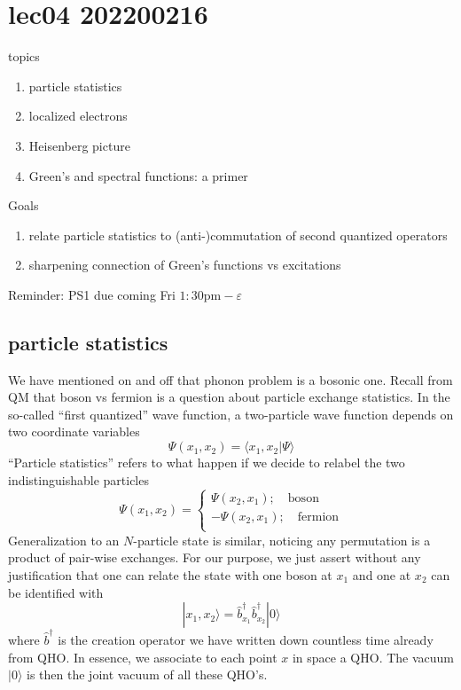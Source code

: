 \chapter{lec04 202200216}

topics

\begin{enumerate}
    \item particle statistics
    \item localized electrons
    \item Heisenberg picture
    \item Green's and spectral functions: a primer
\end{enumerate}

Goals

\begin{enumerate}
    \item relate particle statistics to (anti-)commutation of second quantized operators
    \item sharpening connection of Green's functions vs excitations
\end{enumerate}

Reminder: PS1 due coming Fri $1:30\text{pm}-\varepsilon$

\section{particle statistics}

We have mentioned on and off that phonon problem is a bosonic one. Recall from QM that boson vs fermion is a question about particle exchange statistics. In the so-called ``first quantized'' wave function, a two-particle wave function depends on two coordinate variables
\[ \Psi \left( x_1,x_2 \right) =\langle x_1,x_2|\Psi \rangle \]
``Particle statistics'' refers to what happen if we decide to relabel the two indistinguishable particles
\[ \Psi \left( x_1,x_2 \right) =\begin{cases}
	\Psi \left( x_2,x_1 \right) ;\quad \mathrm{boson}\\
	-\Psi \left( x_2,x_1 \right) ;\quad \mathrm{fermion}\\
\end{cases}\]
Generalization to an $N$-particle state is similar, noticing any permutation is a product of pair-wise exchanges. For our purpose, we just assert without any justification that one can relate the state with one boson at $x_1$ and one at $x_2$ can be identified with
\[ |x_1,x_2\rangle =\hat{b}_{x_1}^{\dagger}\hat{b}_{x_2}^{\dagger}|0\rangle \]
where $\hat{b}^\dagger$ is the creation operator we have written down countless time already from QHO. In essence, we associate to each point $x$ in space a QHO. The vacuum $|0\rangle$ is then the joint vacuum of all these QHO's.

